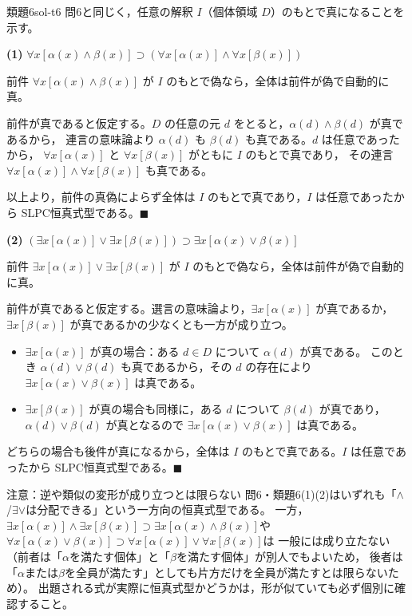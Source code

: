 \documentclass[autodetect-engine,dvi=dvipdfmx,ja=standard]{bxjsarticle}
\begin{document}
\begin{solution}{類題6}{sol-t6}
問6と同じく，任意の解釈 \(I\)（個体領域 \(D\)）のもとで真になることを示す。

\textbf{(1)} \(\forall x[\alpha(x)\land\beta(x)]\supset(\forall x[\alpha(x)]\land\forall x[\beta(x)])\)

前件 \(\forall x[\alpha(x)\land\beta(x)]\) が \(I\) のもとで偽なら，全体は前件が偽で自動的に真。

前件が真であると仮定する。\(D\) の任意の元 \(d\) をとると，\(\alpha(d)\land\beta(d)\) が真であるから，
連言の意味論より \(\alpha(d)\) も \(\beta(d)\) も真である。\(d\) は任意であったから，
\(\forall x[\alpha(x)]\) と \(\forall x[\beta(x)]\) がともに \(I\) のもとで真であり，
その連言 \(\forall x[\alpha(x)]\land\forall x[\beta(x)]\) も真である。

以上より，前件の真偽によらず全体は \(I\) のもとで真であり，\(I\) は任意であったから
SLPC恒真式型である。\hfill\(\blacksquare\)

\textbf{(2)} \((\exists x[\alpha(x)]\lor\exists x[\beta(x)])\supset\exists x[\alpha(x)\lor\beta(x)]\)

前件 \(\exists x[\alpha(x)]\lor\exists x[\beta(x)]\) が \(I\) のもとで偽なら，全体は前件が偽で自動的に真。

前件が真であると仮定する。選言の意味論より，\(\exists x[\alpha(x)]\) が真であるか，
\(\exists x[\beta(x)]\) が真であるかの少なくとも一方が成り立つ。

\begin{itemize}
  \item \(\exists x[\alpha(x)]\) が真の場合：ある \(d\in D\) について \(\alpha(d)\) が真である。
    このとき \(\alpha(d)\lor\beta(d)\) も真であるから，その \(d\) の存在により
    \(\exists x[\alpha(x)\lor\beta(x)]\) は真である。
  \item \(\exists x[\beta(x)]\) が真の場合も同様に，ある \(d\) について \(\beta(d)\) が真であり，
    \(\alpha(d)\lor\beta(d)\) が真となるので \(\exists x[\alpha(x)\lor\beta(x)]\) は真である。
\end{itemize}
どちらの場合も後件が真になるから，全体は \(I\) のもとで真である。\(I\) は任意であったから
SLPC恒真式型である。\hfill\(\blacksquare\)

\begin{sidebox}[TBred]{注意：逆や類似の変形が成り立つとは限らない}
問6・類題6(1)(2)はいずれも「\(\land\)/\(\exists\lor\)は分配できる」という一方向の恒真式型である。
一方，\(\exists x[\alpha(x)]\land\exists x[\beta(x)]\supset\exists x[\alpha(x)\land\beta(x)]\)や
\(\forall x[\alpha(x)\lor\beta(x)]\supset\forall x[\alpha(x)]\lor\forall x[\beta(x)]\)は
一般には成り立たない（前者は「\(\alpha\)を満たす個体」と「\(\beta\)を満たす個体」が別人でもよいため，
後者は「\(\alpha\)または\(\beta\)を全員が満たす」としても片方だけを全員が満たすとは限らないため）。
出題される式が実際に恒真式型かどうかは，形が似ていても必ず個別に確認すること。
\end{sidebox}
\end{solution}
\end{document}
